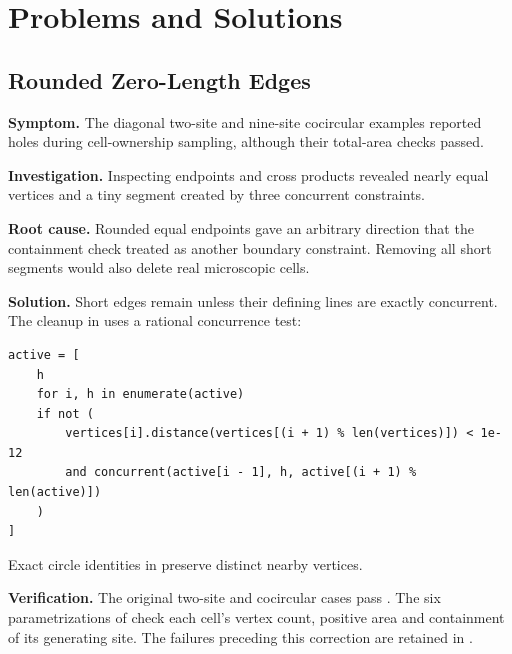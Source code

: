 \section{Problems and Solutions}
\label{sec:6}
\lstset{aboveskip=7pt,belowskip=7pt,lineskip=0pt}

\subsection{Rounded Zero-Length Edges}

\textbf{Symptom.} The diagonal two-site and nine-site cocircular examples reported holes during cell-ownership sampling, although their total-area checks passed.

\textbf{Investigation.} Inspecting endpoints and cross products revealed nearly equal vertices and a tiny segment created by three concurrent constraints.

\textbf{Root cause.} Rounded equal endpoints gave an arbitrary direction that the containment check treated as another boundary constraint. Removing all short segments would also delete real microscopic cells.

\textbf{Solution.} Short edges remain unless their defining lines are exactly concurrent. The cleanup in  uses a rational concurrence test:

\noindent\begin{minipage}{\linewidth}
\begin{lstlisting}[caption={Remove a short support only after proving concurrence.},label={lst:concurrent-fix}]
active = [
    h
    for i, h in enumerate(active)
    if not (
        vertices[i].distance(vertices[(i + 1) % len(vertices)]) < 1e-12
        and concurrent(active[i - 1], h, active[(i + 1) % len(active)])
    )
]
\end{lstlisting}
\end{minipage}

Exact circle identities in  preserve distinct nearby vertices.

\textbf{Verification.} The original two-site and cocircular cases pass . The six parametrizations of  check each cell's vertex count, positive area and containment of its generating site. The failures preceding this correction are retained in .

